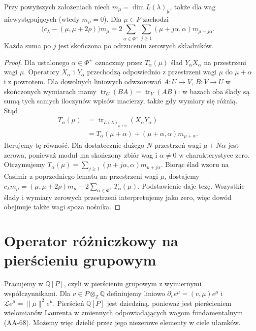 \begin{lemat}
\label{aa:lem:weyl-weight-trace}
Przy powyższych założeniach niech $m_\mu=\dim L(\lambda)_\mu$, także dla wag niewystępujących (wtedy $m_\mu=0$). Dla $\mu\in P$ zachodzi
\[
 \bigl(c_\lambda-(\mu,\mu+2\rho)\bigr)m_\mu
 =2\sum_{\alpha\in\Phi^+}\sum_{j\ge1}
       (\mu+j\alpha,\alpha)m_{\mu+j\alpha}.
\]
Każda suma po $j$ jest skończona po odrzuceniu zerowych składników.
\end{lemat}
\begin{proof}
Dla ustalonego $\alpha\in\Phi^+$ oznaczmy przez $T_\alpha(\mu)$ ślad $Y_\alpha X_\alpha$ na przestrzeni wagi $\mu$. Operatory $X_\alpha$ i $Y_\alpha$ przechodzą odpowiednio z przestrzeni wagi $\mu$ do $\mu+\alpha$ i z powrotem. Dla dowolnych liniowych odwzorowań $A:U\to V$, $B:V\to U$ w skończonych wymiarach mamy $\operatorname{tr}_U(BA)=\operatorname{tr}_V(AB)$: w bazach oba ślady są sumą tych samych iloczynów wpisów macierzy, także gdy wymiary się różnią. Stąd
\[
 \begin{aligned}
 T_\alpha(\mu)&=\operatorname{tr}_{L(\lambda)_{\mu+\alpha}}
                       (X_\alpha Y_\alpha)\\
 &=T_\alpha(\mu+\alpha)
       +(\mu+\alpha,\alpha)m_{\mu+\alpha}.
 \end{aligned}
\]
Iterujemy tę równość. Dla dostatecznie dużego $N$ przestrzeń wagi $\mu+N\alpha$ jest zerowa, ponieważ moduł ma skończony zbiór wag i $\alpha\ne0$ w charakterystyce zero. Otrzymujemy $T_\alpha(\mu)=\sum_{j\ge1}(\mu+j\alpha,\alpha)m_{\mu+j\alpha}$. Biorąc ślad wzoru na Casimir z poprzedniego lematu na przestrzeni wagi $\mu$, dostajemy
$c_\lambda m_\mu=(\mu,\mu+2\rho)m_\mu+2\sum_{\alpha\in\Phi^+}T_\alpha(\mu)$.
Podstawienie daje tezę. Wszystkie ślady i wymiary zerowych przestrzeni interpretujemy jako zero, więc dowód obejmuje także wagi spoza nośnika.
\end{proof}

\section{Operator różniczkowy na pierścieniu grupowym}

Pracujemy w $\mathbb Q[P]$, czyli w pierścieniu grupowym z wymiernymi współczynnikami. Dla $v\in P\otimes_{\mathbb Z}\mathbb Q$ definiujemy liniowo $\partial_v e^\mu=(v,\mu)e^\mu$ i $\mathcal L e^\mu=\|\mu\|^2 e^\mu$. Pierścień $\mathbb Q[P]$ jest dziedziną, ponieważ jest pierścieniem wielomianów Laurenta w zmiennych odpowiadających wagom fundamentalnym (AA-68). Możemy więc dzielić przez jego niezerowe elementy w ciele ułamków.

